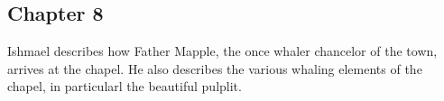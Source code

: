 \subsection{Chapter 8}

Ishmael describes how Father Mapple, the once whaler chancelor of the town,
arrives at the chapel. He also describes the various whaling elements of the
chapel, in particularl the beautiful pulplit.
